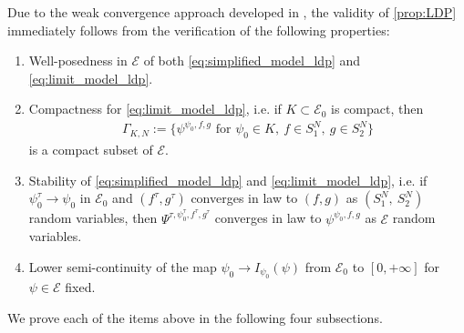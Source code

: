 \documentclass[a4paper,10pt]{amsart}
\newtheorem{proposition}[theorem]{Proposition}
\theoremstyle{remark}
\numberwithin{equation}{section}
\begin{document}
Due to the weak convergence approach developed in \cite{LDPweak_convergence}, the validity of \cref{prop:LDP} immediately follows from the verification of the following properties:
\begin{enumerate}
    \item Well-posedness in $\mathcal{E}$ of both \eqref{eq:simplified_model_ldp} and \eqref{eq:limit_model_ldp}.
    \item Compactness for \eqref{eq:limit_model_ldp}, i.e. if $K\subset \mathcal{E}_0$ is compact, then \begin{align*}
        \Gamma_{K,N}:=\{\psi^{\psi_0,f,g}\mbox{ for }\psi_0\in K,\ f\in S_1^N,\ g\in S_2^N\}
    \end{align*} 
    is a compact subset of $\mathcal{E}$.
    \item Stability of \eqref{eq:simplified_model_ldp} and \eqref{eq:limit_model_ldp}, i.e. if $\psi_0^\tau\rightarrow \psi_0$ in $\mathcal{E}_0$ and $(f^\tau,g^\tau)$ converges in law to  $(f,g)$ as $(S_1^N,\ S_2^N)$ random variables, then $\Psi^{\tau,\psi^{\tau}_0,f^\tau,g^\tau}$ converges in law to $\psi^{\psi_0,f,g}$ as $\mathcal{E}$ random variables. 
    \item Lower semi-continuity of the map $\psi_0\rightarrow I_{\psi_0}(\psi)$ from $\mathcal{E}_0$ to $[0,+\infty]$ for $\psi\in \mathcal{E}$ fixed.
\end{enumerate}
We prove each of the items above in the following four subsections.
\end{document}
